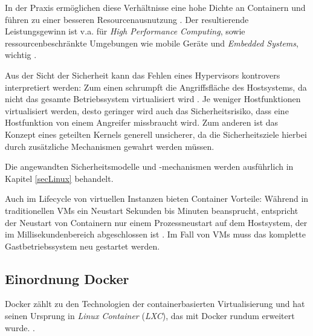 \documentclass[../main.tex]{subfiles}
\begin{document}
			In der Praxis ermöglichen diese Verhältnisse eine hohe Dichte an Containern und führen zu einer besseren Resourcenausnutzung \cite[S.7f.]{dockerBook}. Der resultierende Leistungsgewinn ist v.a. für \emph{High Performance Computing}, sowie ressourcenbeschränkte Umgebungen wie mobile Geräte und \emph{Embedded Systems}, wichtig \cite[S.1]{dockerSec2}.

      Aus der Sicht der Sicherheit kann das Fehlen eines Hypervisors kontrovers interpretiert werden: Zum einen schrumpft die Angriffsfläche des Hostsystems, da nicht das gesamte Betriebssystem virtualisiert wird \cite[S.6]{dockerBook}. Je weniger Hostfunktionen virtualisiert werden, desto geringer wird auch das Sicherheitsrisiko, dass eine Hostfunktion von einem Angreifer missbraucht wird. Zum anderen ist das Konzept eines geteilten Kernels generell unsicherer, da die Sicherheitsziele hierbei durch zusätzliche Mechanismen gewahrt werden müssen.

			Die angewandten Sicherheitsmodelle und -mechanismen werden ausführlich in Kapitel \ref{secLinux} behandelt.



			Auch im Lifecycle von virtuellen Instanzen bieten Container Vorteile: Während in traditionellen \acrshort{VM}s ein Neustart Sekunden bis Minuten beansprucht, entspricht der Neustart von Containern nur einem Prozessneustart auf dem Hostsystem, der im Millisekundenbereich abgeschlossen ist \cite[S.2]{dockerLXCKub}.
			Im Fall von VMs muss das komplette Gastbetriebssystem neu gestartet werden.

	  \subsection{Einordnung Docker}
      Docker zählt zu den Technologien der containerbasierten Virtualisierung und hat seinen Ursprung in \emph{Linux Container} (\emph{LXC}), das mit Docker rundum erweitert wurde. \cite[S.7]{dockerBook}\cite[S.1]{containerVirtPerformance}\cite[S.2]{dockerLXCKub}.
\end{document}
